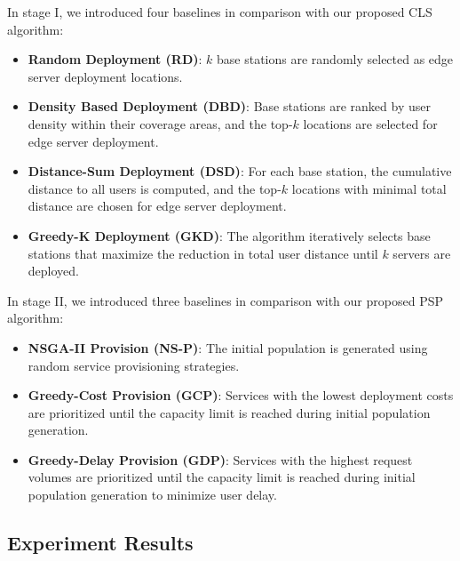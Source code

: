 \documentclass[10pt, conference, letterpaper]{IEEEtran}
\begin{document}
In stage I, we introduced four baselines in comparison with our proposed CLS algorithm:
\begin{itemize}
    \item \textbf{Random Deployment (RD)}: $k$ base stations are randomly selected as edge server deployment locations.
    \item \textbf{Density Based Deployment (DBD)}: Base stations are ranked by user density within their coverage areas, and the top-$k$ locations are selected for edge server deployment.
    \item \textbf{Distance-Sum Deployment (DSD)}: For each base station, the cumulative distance to all users is computed, and the top-$k$ locations with minimal total distance are chosen for edge server deployment.
    \item \textbf{Greedy-K Deployment (GKD)}: The algorithm iteratively selects base stations that maximize the reduction in total user distance until $k$ servers are deployed.
\end{itemize}

In stage II, we introduced three baselines in comparison with our proposed PSP algorithm:
\begin{itemize}
    \item \textbf{NSGA-II Provision (NS-P)}: The initial population is generated using random service provisioning strategies.
    \item \textbf{Greedy-Cost Provision (GCP)}: Services with the lowest deployment costs are prioritized until the capacity limit is reached during initial population generation.
    \item \textbf{Greedy-Delay Provision (GDP)}: Services with the highest request volumes are prioritized until the capacity limit is reached during initial population generation to minimize user delay.
\end{itemize}

\subsection{Experiment Results}
\end{document}
